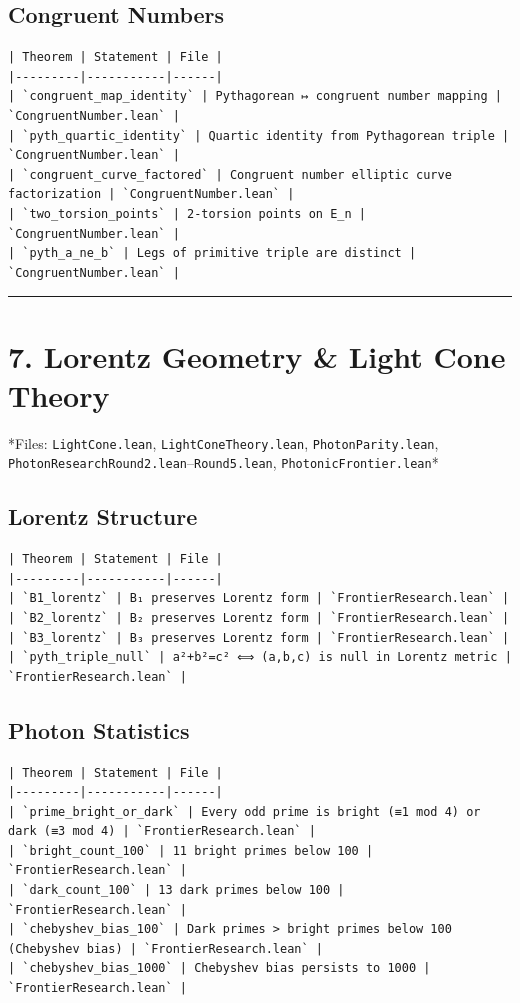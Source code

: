 \documentclass[12pt,a4paper,openany]{book}
\begin{document}
\subsection{Congruent Numbers}
\begin{verbatim}
| Theorem | Statement | File |
|---------|-----------|------|
| `congruent_map_identity` | Pythagorean ↦ congruent number mapping | `CongruentNumber.lean` |
| `pyth_quartic_identity` | Quartic identity from Pythagorean triple | `CongruentNumber.lean` |
| `congruent_curve_factored` | Congruent number elliptic curve factorization | `CongruentNumber.lean` |
| `two_torsion_points` | 2-torsion points on E_n | `CongruentNumber.lean` |
| `pyth_a_ne_b` | Legs of primitive triple are distinct | `CongruentNumber.lean` |
\end{verbatim}

\bigskip\hrule\bigskip

\section{7. Lorentz Geometry \& Light Cone Theory}

*Files: \texttt{LightCone.lean}, \texttt{LightConeTheory.lean}, \texttt{PhotonParity.lean}, \texttt{PhotonResearchRound2.lean}–\texttt{Round5.lean}, \texttt{PhotonicFrontier.lean}*

\subsection{Lorentz Structure}
\begin{verbatim}
| Theorem | Statement | File |
|---------|-----------|------|
| `B1_lorentz` | B₁ preserves Lorentz form | `FrontierResearch.lean` |
| `B2_lorentz` | B₂ preserves Lorentz form | `FrontierResearch.lean` |
| `B3_lorentz` | B₃ preserves Lorentz form | `FrontierResearch.lean` |
| `pyth_triple_null` | a²+b²=c² ⟺ (a,b,c) is null in Lorentz metric | `FrontierResearch.lean` |
\end{verbatim}

\subsection{Photon Statistics}
\begin{verbatim}
| Theorem | Statement | File |
|---------|-----------|------|
| `prime_bright_or_dark` | Every odd prime is bright (≡1 mod 4) or dark (≡3 mod 4) | `FrontierResearch.lean` |
| `bright_count_100` | 11 bright primes below 100 | `FrontierResearch.lean` |
| `dark_count_100` | 13 dark primes below 100 | `FrontierResearch.lean` |
| `chebyshev_bias_100` | Dark primes > bright primes below 100 (Chebyshev bias) | `FrontierResearch.lean` |
| `chebyshev_bias_1000` | Chebyshev bias persists to 1000 | `FrontierResearch.lean` |
\end{verbatim}
\end{document}
